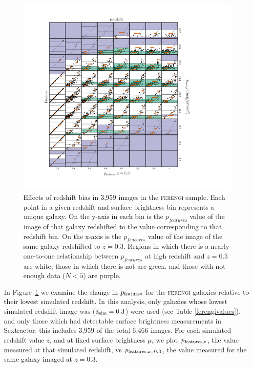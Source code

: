 \documentclass[usenatbib]{mn2e}
\newcommand{\ferengi}{\textsc{ferengi}}
\begin{document}
\begin{figure}
\begin{center}
\includegraphics[width=\textwidth]{figures/p_vs_p_SB_redshift.pdf}
\caption{Effects of redshift bias in 3,959 images in the \ferengi{} sample. Each point in a given redshift and surface brightness bin represents a unique galaxy. On the y-axis in each bin is the $p_{features}$ value of the image of that galaxy redshifted to the value corresponding to that redshift bin. On the x-axis is the $p_{features}$ value of the image of the same galaxy redshifted to $z=0.3$. Regions in which there is a nearly one-to-one relationship between $p_{features}$ at high redshift and $z=0.3$ are white; those in which there is not are green, and those with not enough data ($N<5$) are purple. }
\label{fig:p_vs_p}
\end{center}
\end{figure}

In Figure~\ref{fig:p_vs_p} we examine the change in $p_{\rm features}$ for the \ferengi{} galaxies relative to their lowest simulated redshift. In this analysis, only galaxies whose lowest simulated redshift image was ($\rm z_{sim}=0.3$) were used (see Table \ref{ferengivalues}), and only those which had detectable surface brightness measurements in Sextractor; this includes 3,959 of the total 6,466 images. For each simulated redshift value $z$, and at fixed surface brightness $\mu$, we plot $p_{\rm features,z}$, the value measured at that simulated redshift, vs $p_{\rm features,z=0.3}$, the value measured for the same galaxy imaged at $z=0.3$. 
 
\end{document}
